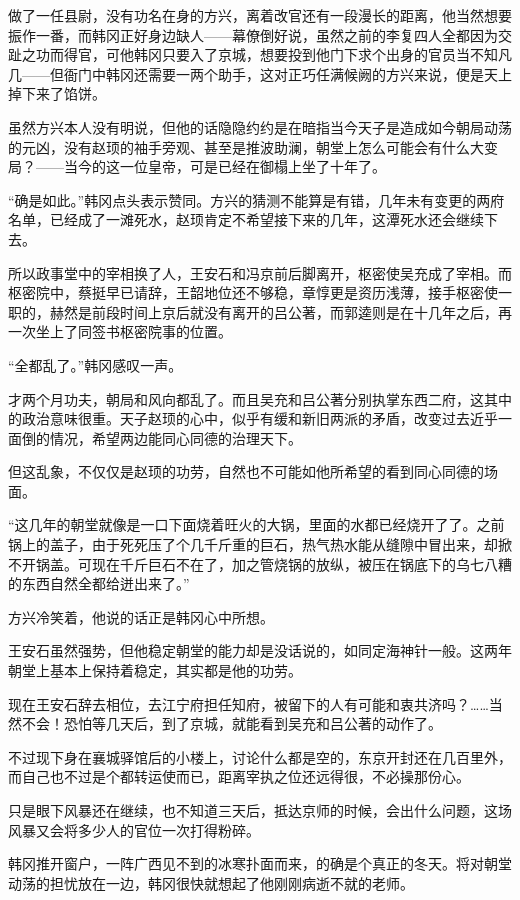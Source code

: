 做了一任县尉，没有功名在身的方兴，离着改官还有一段漫长的距离，他当然想要振作一番，而韩冈正好身边缺人——幕僚倒好说，虽然之前的李复四人全都因为交趾之功而得官，可他韩冈只要入了京城，想要投到他门下求个出身的官员当不知凡几——但衙门中韩冈还需要一两个助手，这对正巧任满候阙的方兴来说，便是天上掉下来了馅饼。

虽然方兴本人没有明说，但他的话隐隐约约是在暗指当今天子是造成如今朝局动荡的元凶，没有赵顼的袖手旁观、甚至是推波助澜，朝堂上怎么可能会有什么大变局？——当今的这一位皇帝，可是已经在御榻上坐了十年了。

“确是如此。”韩冈点头表示赞同。方兴的猜测不能算是有错，几年未有变更的两府名单，已经成了一滩死水，赵顼肯定不希望接下来的几年，这潭死水还会继续下去。

所以政事堂中的宰相换了人，王安石和冯京前后脚离开，枢密使吴充成了宰相。而枢密院中，蔡挺早已请辞，王韶地位还不够稳，章惇更是资历浅薄，接手枢密使一职的，赫然是前段时间上京后就没有离开的吕公著，而郭逵则是在十几年之后，再一次坐上了同签书枢密院事的位置。

“全都乱了。”韩冈感叹一声。

才两个月功夫，朝局和风向都乱了。而且吴充和吕公著分别执掌东西二府，这其中的政治意味很重。天子赵顼的心中，似乎有缓和新旧两派的矛盾，改变过去近乎一面倒的情况，希望两边能同心同德的治理天下。

但这乱象，不仅仅是赵顼的功劳，自然也不可能如他所希望的看到同心同德的场面。

“这几年的朝堂就像是一口下面烧着旺火的大锅，里面的水都已经烧开了了。之前锅上的盖子，由于死死压了个几千斤重的巨石，热气热水能从缝隙中冒出来，却掀不开锅盖。可现在千斤巨石不在了，加之管烧锅的放纵，被压在锅底下的乌七八糟的东西自然全都给迸出来了。”

方兴冷笑着，他说的话正是韩冈心中所想。

王安石虽然强势，但他稳定朝堂的能力却是没话说的，如同定海神针一般。这两年朝堂上基本上保持着稳定，其实都是他的功劳。

现在王安石辞去相位，去江宁府担任知府，被留下的人有可能和衷共济吗？……当然不会！恐怕等几天后，到了京城，就能看到吴充和吕公著的动作了。

不过现下身在襄城驿馆后的小楼上，讨论什么都是空的，东京开封还在几百里外，而自己也不过是个都转运使而已，距离宰执之位还远得很，不必操那份心。

只是眼下风暴还在继续，也不知道三天后，抵达京师的时候，会出什么问题，这场风暴又会将多少人的官位一次打得粉碎。

韩冈推开窗户，一阵广西见不到的冰寒扑面而来，的确是个真正的冬天。将对朝堂动荡的担忧放在一边，韩冈很快就想起了他刚刚病逝不就的老师。

